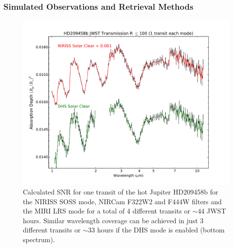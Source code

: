 \documentclass[iop]{emulateapj}
\begin{document}
\subsubsection{Simulated Observations and Retrieval Methods}
\begin{figure}[t]
\centering
\includegraphics[width=1.0\columnwidth]{HD209458b_solar_clear_1transit_DHS_vs_NIRISS_NIRCam_MIRILRS_R100.pdf}
\caption{Calculated SNR for one transit of the hot Jupiter HD209458b for the NIRISS SOSS mode, NIRCam F322W2 and F444W filters and the MIRI LRS mode for a total of 4 different transits or $\sim$44 JWST hours.
Similar wavelength coverage can be achieved in just 3 different transits or $\sim$33 hours if the DHS mode is enabled (bottom spectrum).}\label{fig:DHSvsNIRISS209}
\end{figure}
\end{document}

